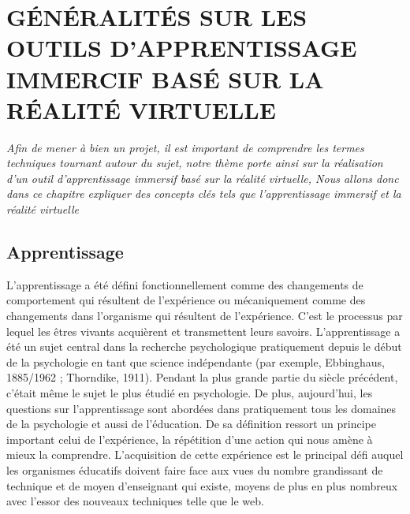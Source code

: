 


\chapter{GÉNÉRALITÉS SUR LES OUTILS D'APPRENTISSAGE IMMERCIF BASÉ SUR LA RÉALITÉ VIRTUELLE}


\textit{Afin de mener à bien un projet, il est important de comprendre les termes techniques tournant autour du sujet, notre thème porte ainsi sur la réalisation d'un outil d'apprentissage immersif basé sur la réalité virtuelle, Nous allons donc dans ce chapitre expliquer des concepts clés tels que l'apprentissage immersif et la réalité virtuelle}
\clearpage

\section{Apprentissage}

L'apprentissage a été défini fonctionnellement comme des changements de comportement qui résultent de l'expérience ou mécaniquement comme des changements dans l'organisme qui résultent de l'expérience\cite{deHouwer2013WhatIL}.
C'est le processus par lequel les êtres vivants acquièrent et transmettent leurs savoirs.
L'apprentissage a été un sujet central dans la recherche psychologique pratiquement depuis le début de la psychologie
en tant que science indépendante (par exemple, Ebbinghaus, 1885/1962 ; Thorndike, 1911).
Pendant la plus grande partie du siècle précédent, c'était même le sujet le plus étudié en psychologie.
De plus, aujourd'hui, les questions sur l'apprentissage sont abordées dans pratiquement tous les domaines de la psychologie et aussi de l'éducation\cite{deHouwer2013WhatIL}.
De sa définition ressort un principe important celui de l'expérience, la répétition d'une action qui nous amène à mieux la comprendre.
L'acquisition de cette expérience est le principal défi auquel les organismes éducatifs doivent faire face aux vues du nombre grandissant de technique et de moyen d'enseignant qui existe, moyens de plus en plus nombreux avec
l'essor des nouveaux techniques telle que le web.

